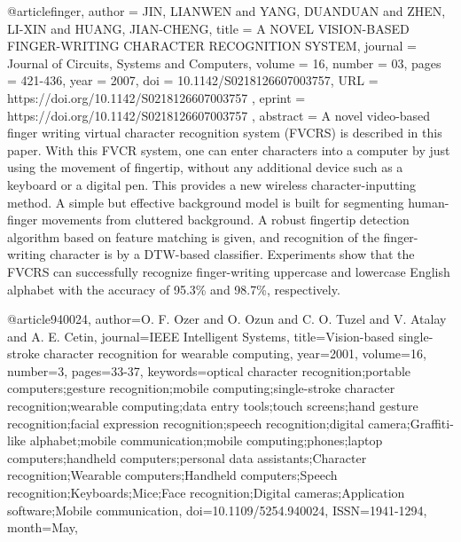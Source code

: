 @article{finger,
author = {JIN, LIANWEN and YANG, DUANDUAN and ZHEN, LI-XIN and HUANG, JIAN-CHENG},
title = {A NOVEL VISION-BASED FINGER-WRITING CHARACTER RECOGNITION SYSTEM},
journal = {Journal of Circuits, Systems and Computers},
volume = {16},
number = {03},
pages = {421-436},
year = {2007},
doi = {10.1142/S0218126607003757},
URL = { 
        https://doi.org/10.1142/S0218126607003757
},
eprint = { 
        https://doi.org/10.1142/S0218126607003757
}
,
    abstract = { A novel video-based finger writing virtual character recognition system (FVCRS) is described in this paper. With this FVCR system, one can enter characters into a computer by just using the movement of fingertip, without any additional device such as a keyboard or a digital pen. This provides a new wireless character-inputting method. A simple but effective background model is built for segmenting human-finger movements from cluttered background. A robust fingertip detection algorithm based on feature matching is given, and recognition of the finger-writing character is by a DTW-based classifier. Experiments show that the FVCRS can successfully recognize finger-writing uppercase and lowercase English alphabet with the accuracy of 95.3\% and 98.7\%, respectively. }
}


@article{940024,
author={O. F. {Ozer} and O. {Ozun} and C. O. {Tuzel} and V. {Atalay} and A. E. {Cetin}},
journal={IEEE Intelligent Systems},
title={Vision-based single-stroke character recognition for wearable computing},
year={2001},
volume={16},
number={3},
pages={33-37},
keywords={optical character recognition;portable computers;gesture recognition;mobile computing;single-stroke character recognition;wearable computing;data entry tools;touch screens;hand gesture recognition;facial expression recognition;speech recognition;digital camera;Graffiti-like alphabet;mobile communication;mobile computing;phones;laptop computers;handheld computers;personal data assistants;Character recognition;Wearable computers;Handheld computers;Speech recognition;Keyboards;Mice;Face recognition;Digital cameras;Application software;Mobile communication},
doi={10.1109/5254.940024},
ISSN={1941-1294},
month={May},}



